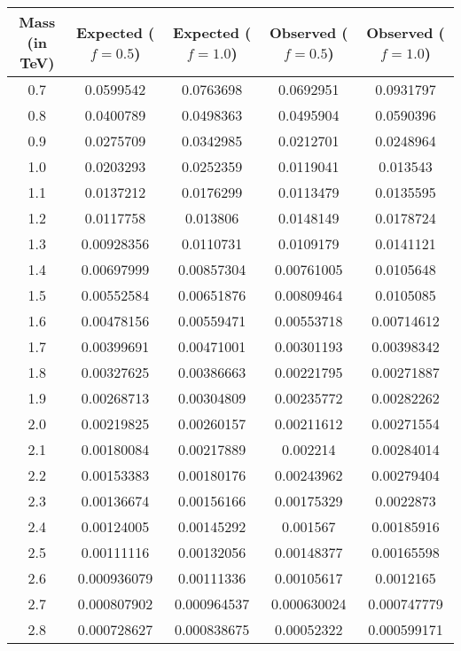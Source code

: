 \begin{table}[h!]
\begin{center}
\begin{tabular}{|c||c|c||c|c|}
\hline
{\bf Mass (in TeV)} & {\bf Expected ($f=0.5$) }& {\bf Expected ($f=1.0$)} & {\bf Observed ($f=0.5$)} &{\bf Observed ($f=1.0$) }\\
\hline
\hline
0.7 & 0.0599542 &  0.0763698 & 0.0692951 &  0.0931797 \\
0.8 & 0.0400789 &  0.0498363 & 0.0495904 &  0.0590396 \\
0.9 & 0.0275709 &  0.0342985 & 0.0212701 &  0.0248964 \\
1.0 & 0.0203293 &  0.0252359 & 0.0119041 &  0.013543 \\
1.1 & 0.0137212 &  0.0176299 & 0.0113479 &  0.0135595 \\
1.2 & 0.0117758 &  0.013806 & 0.0148149 &  0.0178724 \\
1.3 & 0.00928356 &  0.0110731 & 0.0109179 &  0.0141121 \\
1.4 & 0.00697999 &  0.00857304 & 0.00761005 &  0.0105648 \\
1.5 & 0.00552584 &  0.00651876 & 0.00809464 &  0.0105085 \\
1.6 & 0.00478156 &  0.00559471 & 0.00553718 &  0.00714612 \\
1.7 & 0.00399691 &  0.00471001 & 0.00301193 &  0.00398342 \\
1.8 & 0.00327625 &  0.00386663 & 0.00221795 &  0.00271887 \\
1.9 & 0.00268713 &  0.00304809 & 0.00235772 &  0.00282262 \\
2.0 & 0.00219825 &  0.00260157 & 0.00211612 &  0.00271554 \\
2.1 & 0.00180084 &  0.00217889 & 0.002214 &  0.00284014 \\
2.2 & 0.00153383 &  0.00180176 & 0.00243962 &  0.00279404 \\
2.3 & 0.00136674 &  0.00156166 & 0.00175329 &  0.0022873 \\
2.4 & 0.00124005 &  0.00145292 & 0.001567 &  0.00185916 \\
2.5 & 0.00111116 &  0.00132056 & 0.00148377 &  0.00165598 \\
2.6 & 0.000936079 &  0.00111336 & 0.00105617 &  0.0012165 \\
2.7 & 0.000807902 &  0.000964537 & 0.000630024 &  0.000747779 \\
2.8 & 0.000728627 &  0.000838675 & 0.00052322 &  0.000599171 \\

\end{tabular}
\end{center}
\end{table}
